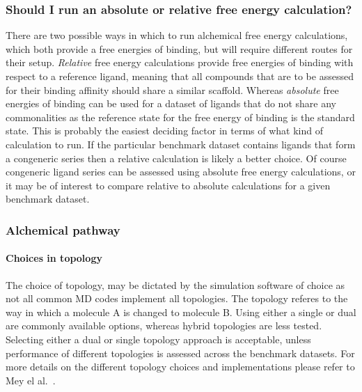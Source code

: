 \documentclass[9pt,bestpractices]{livecoms}
\begin{document}
\subsubsection{Should I run an absolute or relative free energy calculation?}
There are two possible ways in which to run alchemical free energy calculations, which both provide a free energies of binding, but will require different routes for their setup. \textit{Relative} free energy calculations provide free energies of binding with respect to a reference ligand, meaning that all compounds that are to be assessed for their binding affinity should share a similar scaffold. Whereas \textit{absolute} free energies of binding can be used for a dataset of ligands that do not share any commonalities as the reference state for the free energy of binding is the standard state. This is probably the easiest deciding factor in terms of what kind of calculation to run. If the particular benchmark dataset contains ligands that form a congeneric series then a relative calculation is likely a better  choice. Of course congeneric ligand series can be assessed using absolute free energy calculations, or it may be of interest to compare relative to absolute calculations for a given benchmark dataset. 


\subsubsection{Alchemical pathway}

\paragraph{Choices in topology}
The choice of topology, may be dictated by the simulation software of choice as not all common MD codes implement all topologies. The topology referes to the way in which a molecule A is changed to molecule B. Using either a single or dual are commonly available options, whereas hybrid topologies are less tested. Selecting either a dual or single topology approach is acceptable, unless performance of different topologies is assessed across the benchmark datasets. For more details on the different topology choices and implementations please refer to Mey el al.~\cite{meyBestPracticesAlchemical2020}.
\end{document}
